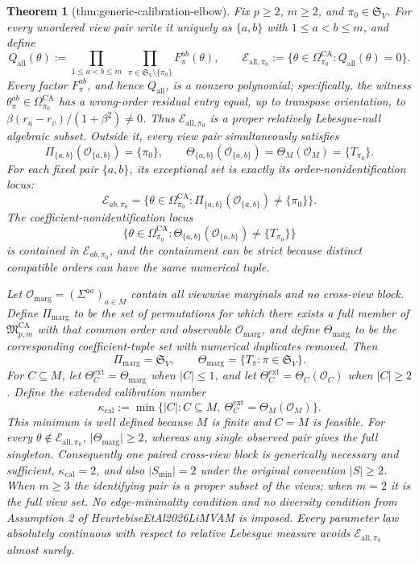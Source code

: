 \documentclass{article}
\newtheorem{theorem}{Theorem}
\begin{document}
\begin{theorem}[thm:generic-calibration-elbow]\label{thm:generic-calibration-elbow}
Fix \(p\ge 2\), \(m\ge 2\), and \(\pi_0\in\mathfrak S_V\).  For every unordered view pair write it uniquely as \(\{a,b\}\) with \(1\le a<b\le m\), and define
\[
Q_{\mathrm{all}}(\theta)
:=
\prod_{1\le a<b\le m}\ \prod_{\pi\in\mathfrak S_V\setminus\{\pi_0\}}
F_\pi^{ab}(\theta),
\qquad
\mathcal E_{\mathrm{all},\pi_0}
:=
\{\theta\in\Omega_{\pi_0}^{\mathrm{CA}}:Q_{\mathrm{all}}(\theta)=0\}.
\]
Every factor \(F_\pi^{ab}\), and hence \(Q_{\mathrm{all}}\), is a nonzero polynomial; specifically, the witness \(\theta_\pi^{ab}\in\Omega_{\pi_0}^{\mathrm{CA}}\) has a wrong-order residual entry equal, up to transpose orientation, to \(\beta(r_u-r_v)/(1+\beta^2)\ne0\).  Thus \(\mathcal E_{\mathrm{all},\pi_0}\) is a proper relatively Lebesgue-null algebraic subset.  Outside it, every view pair simultaneously satisfies
\[
\Pi_{\{a,b\}}(\mathcal O_{\{a,b\}})=\{\pi_0\},
\qquad
\Theta_{\{a,b\}}(\mathcal O_{\{a,b\}})
=\Theta_M(\mathcal O_M)=\{T_{\pi_0}\}.
\]
For each fixed pair \(\{a,b\}\), its exceptional set is exactly its order-nonidentification locus:
\[
\mathcal E_{ab,\pi_0}
=
\{\theta\in\Omega_{\pi_0}^{\mathrm{CA}}:
\Pi_{\{a,b\}}(\mathcal O_{\{a,b\}})\ne\{\pi_0\}\}.
\]
The coefficient-nonidentification locus
\[
\{\theta\in\Omega_{\pi_0}^{\mathrm{CA}}:
\Theta_{\{a,b\}}(\mathcal O_{\{a,b\}})\ne\{T_{\pi_0}\}\}
\]
is contained in \(\mathcal E_{ab,\pi_0}\), and the containment can be strict because distinct compatible orders can have the same numerical tuple.

Let \(\mathcal O_{\mathrm{marg}}=(\Sigma^{aa})_{a\in M}\) contain all viewwise marginals and no cross-view block.  Define \(\Pi_{\mathrm{marg}}\) to be the set of permutations for which there exists a full member of \(\mathfrak M_{p,m}^{\mathrm{CA}}\) with that common order and observable \(\mathcal O_{\mathrm{marg}}\), and define \(\Theta_{\mathrm{marg}}\) to be the corresponding coefficient-tuple set with numerical duplicates removed.  Then
\[
\Pi_{\mathrm{marg}}=\mathfrak S_V,
\qquad
\Theta_{\mathrm{marg}}=\{T_\pi:\pi\in\mathfrak S_V\}.
\]
For \(C\subseteq M\), let \(\Theta_C^{\mathrm{ext}}=\Theta_{\mathrm{marg}}\) when \(\lvert C\rvert\le1\), and let \(\Theta_C^{\mathrm{ext}}=\Theta_C(\mathcal O_C)\) when \(\lvert C\rvert\ge2\).  Define the extended calibration number
\[
\kappa_{\mathrm{cal}}
:=
\min\{\lvert C\rvert:C\subseteq M,\ 
\Theta_C^{\mathrm{ext}}=\Theta_M(\mathcal O_M)\}.
\]
This minimum is well defined because \(M\) is finite and \(C=M\) is feasible.
For every \(\theta\notin\mathcal E_{\mathrm{all},\pi_0}\), \(\lvert\Theta_{\mathrm{marg}}\rvert\ge2\), whereas any single observed pair gives the full singleton.  Consequently one paired cross-view block is generically necessary and sufficient, \(\kappa_{\mathrm{cal}}=2\), and also \(\lvert S_{\min}\rvert=2\) under the original convention \(\lvert S\rvert\ge2\).  When \(m\ge3\) the identifying pair is a proper subset of the views; when \(m=2\) it is the full view set.  No edge-minimality condition and no diversity condition from Assumption 2 of HeurtebiseEtAl2026LiMVAM is imposed.  Every parameter law absolutely continuous with respect to relative Lebesgue measure avoids \(\mathcal E_{\mathrm{all},\pi_0}\) almost surely.
\end{theorem}
\end{document}
